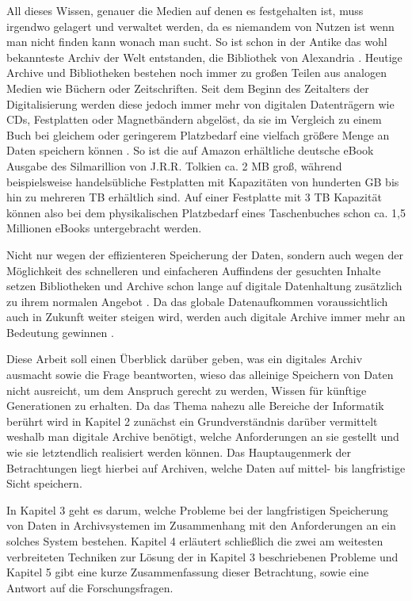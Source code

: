 \documentclass[conference,compsoc,final,a4paper]{IEEEtran}
\begin{document}
All dieses Wissen, genauer die Medien auf denen es festgehalten ist, muss irgendwo gelagert und verwaltet werden, da es niemandem von Nutzen ist wenn man nicht finden kann wonach man sucht. So ist schon in der Antike das wohl bekannteste Archiv der Welt entstanden, die Bibliothek von Alexandria \autocite{BibAlexAntike}. Heutige Archive und Bibliotheken bestehen noch immer zu großen Teilen aus analogen Medien wie Büchern oder Zeitschriften. Seit dem Beginn des Zeitalters der Digitalisierung werden diese jedoch immer mehr von digitalen Datenträgern wie CDs, Festplatten oder Magnetbändern abgelöst, da sie im Vergleich zu einem Buch bei gleichem oder geringerem Platzbedarf eine vielfach größere Menge an Daten speichern können \autocite{KLA2015}. So ist die auf Amazon erhältliche deutsche eBook Ausgabe des Silmarillion von J.R.R. Tolkien ca. 2 \ac{MB} groß, während beispielsweise handelsübliche Festplatten mit Kapazitäten von hunderten \ac{GB} bis hin zu mehreren \ac{TB} erhältlich sind. Auf einer Festplatte mit 3 \ac{TB} Kapazität können also bei dem physikalischen Platzbedarf eines Taschenbuches schon ca. 1,5 Millionen eBooks untergebracht werden.

Nicht nur wegen der effizienteren Speicherung der Daten, sondern auch wegen der Möglichkeit des schnelleren und einfacheren Auffindens der gesuchten Inhalte setzen Bibliotheken und Archive schon lange auf digitale Datenhaltung zusätzlich zu ihrem normalen Angebot \autocite{KLA2015}. Da das globale Datenaufkommen voraussichtlich auch in Zukunft weiter steigen wird, werden auch digitale Archive immer mehr an Bedeutung gewinnen \autocite{Reinsel2018}.

Diese Arbeit soll einen Überblick darüber geben, was ein digitales Archiv ausmacht sowie die Frage beantworten, wieso das alleinige Speichern von Daten nicht ausreicht, um dem Anspruch gerecht zu werden, Wissen für künftige Generationen zu erhalten. Da das Thema nahezu alle Bereiche der Informatik berührt wird in Kapitel 2 zunächst ein Grundverständnis darüber vermittelt weshalb man digitale Archive benötigt, welche Anforderungen an sie gestellt und wie sie letztendlich realisiert werden können. Das Hauptaugenmerk der Betrachtungen liegt hierbei auf Archiven, welche Daten auf mittel- bis langfristige Sicht speichern.

In Kapitel 3 geht es darum, welche Probleme bei der langfristigen Speicherung von Daten in Archivsystemen im Zusammenhang mit den Anforderungen an ein solches System bestehen. Kapitel 4 erläutert schließlich die zwei am weitesten verbreiteten Techniken zur Lösung der in Kapitel 3 beschriebenen Probleme und Kapitel 5 gibt eine kurze Zusammenfassung dieser Betrachtung, sowie eine Antwort auf die Forschungsfragen.
\end{document}
